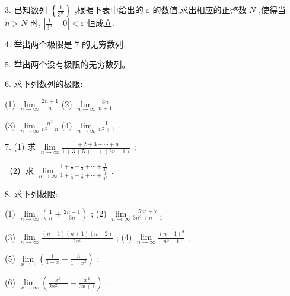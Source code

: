 \documentclass[10pt]{article}
\begin{document}
3. 已知数列 \(\left\{ \frac{1}{{3}^{n}}\right\}\) ,根据下表中给出的 \(\varepsilon\) 的数值,求出相应的正整数 \(N\) ,使得当 \(n > N\) 时, \(\left| {\frac{1}{{3}^{n}} - 0}\right| < \varepsilon\) 恒成立.

\begin{center}
\end{center}

4. 举出两个极限是 7 的无穷数列.

5. 举出两个没有极限的无穷数列。

6. 求下列数列的极限:

(1) \(\mathop{\lim }\limits_{{n \rightarrow \infty }}\frac{{2n} + 1}{n}\) (2) \(\mathop{\lim }\limits_{{n \rightarrow \infty }}\frac{3n}{n + 1}\)

(3) \(\mathop{\lim }\limits_{{n \rightarrow \infty }}\frac{{n}^{2}}{{n}^{2} - n}\) (4) \(\mathop{\lim }\limits_{{n \rightarrow \infty }}\frac{1}{{n}^{2} + 1}\) .

7. (1) 求 \(\mathop{\lim }\limits_{{n \rightarrow \infty }}\frac{1 + 2 + 3 + \cdots + n}{1 + 3 + 5 + \cdots + \left( {{2n} - 1}\right) }\) ;

（2）求 \(\mathop{\lim }\limits_{{n \rightarrow \infty }}\frac{1 + \frac{1}{2} + \frac{1}{4} + \cdots + \frac{1}{{2}^{n}}}{1 + \frac{1}{3} + \frac{1}{9} + \cdots + \frac{1}{{3}^{n}}}\) .

8. 求下列极限:

(1) \(\mathop{\lim }\limits_{{n \rightarrow \infty }}\left( {\frac{1}{n} + \frac{{2n} - 1}{3n}}\right)\) ; (2) \(\mathop{\lim }\limits_{{n \rightarrow \infty }}\frac{5{n}^{2} + 7}{3{n}^{2} + n - 1}\)

(3) \(\mathop{\lim }\limits_{{n \rightarrow \infty }}\frac{\left( {n - 1}\right) \left( {n + 1}\right) \left( {n + 2}\right) }{2{n}^{3}}\) ; (4) \(\mathop{\lim }\limits_{{n \rightarrow \infty }}\frac{{\left( n - 1\right) }^{3}}{{n}^{3} + 1}\) ;

(5) \(\mathop{\lim }\limits_{{x \rightarrow 1}}\left( {\frac{1}{1 - x} - \frac{3}{1 - {x}^{3}}}\right)\) ;

(6) \(\mathop{\lim }\limits_{{x \rightarrow \infty }}\left( {\frac{{x}^{3}}{2{x}^{2} - 1} - \frac{{x}^{2}}{{2x} + 1}}\right)\) .
\end{document}
